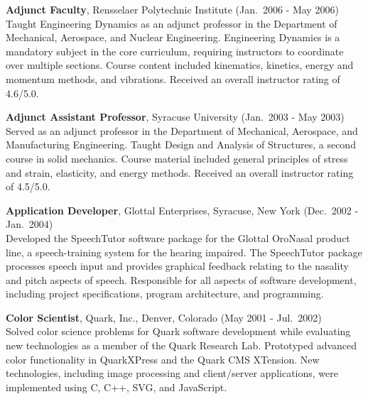 \begin{minipage}{\minipagewidth}
\textbf{Adjunct Faculty}, Rensselaer Polytechnic Institute (Jan.~2006 - May 2006) \\ 
%
Taught Engineering Dynamics as an adjunct professor in the Department of Mechanical, Aerospace, and Nuclear Engineering.  Engineering Dynamics is a mandatory subject in the core curriculum, requiring instructors to coordinate over multiple sections.  Course content included kinematics, kinetics, energy and momentum methods, and vibrations.  Received an overall instructor rating of 4.6/5.0. 
\end{minipage}\vspace{\parskip}


\begin{minipage}{\minipagewidth}
\textbf{Adjunct Assistant Professor}, Syracuse University (Jan.~2003 - May 2003) \\ 
%
Served as an adjunct professor in the Department of Mechanical, Aerospace, and Manufacturing Engineering.  Taught Design and Analysis of Structures, a second course in solid mechanics.  Course material included general principles of stress and strain, elasticity, and energy methods.  Received an overall instructor rating of 4.5/5.0.
\end{minipage}\vspace{\parskip}


\begin{minipage}{\minipagewidth}
\textbf{Application Developer}, Glottal Enterprises, Syracuse, New York (Dec.~2002 - Jan.~2004) \\ 
%
Developed the SpeechTutor software package for the Glottal OroNasal
product line, a speech-training system for the hearing impaired.  The
SpeechTutor package processes speech input and provides graphical
feedback relating to the nasality and pitch aspects of speech.
Responsible for all aspects of software development, including project
specifications, program architecture, and programming.
\end{minipage}\vspace{\parskip}

\begin{minipage}{\minipagewidth}
\textbf{Color Scientist}, Quark, Inc., Denver, Colorado (May 2001 - Jul.~2002) \\ 
%
Solved color science problems for Quark software development while
evaluating new technologies as a member of the Quark Research
Lab. Prototyped advanced color functionality in QuarkXPress and the
Quark CMS XTension. New technologies, including image processing and
client/server applications, were implemented using C, C++, SVG, and
JavaScript.
\end{minipage}\vspace{\parskip}

